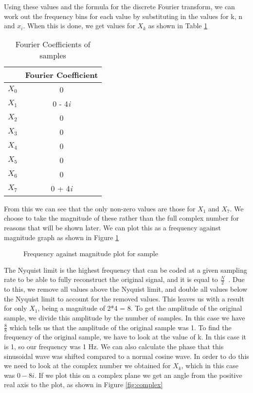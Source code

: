 Using these values and the formula for the discrete Fourier transform, we can work out the frequency bins for each value by substituting in the values for k, n and $x_i$. When this is done, we get values for $X_k$ as shown in Table \ref{table:fourierCoefficient}
\begin{table}[!htb]
\centering
\begin{tabular}{ |c|c| } 
\hline
& Fourier Coefficient \\
\hline
$X_0$ & 0 \\ 
$X_1$ & 0 - 4\textit{i} \\ 
$X_2$ & 0 \\ 
$X_3$ & 0 \\ 
$X_4$ & 0 \\ 
$X_5$ & 0 \\ 
$X_6$ & 0 \\ 
$X_7$ & 0 + 4\textit{i} \\ 
\hline
\end{tabular}
\caption{Fourier Coefficients of samples}
\label{table:fourierCoefficient}
\end{table}
From this we can see that the only non-zero values are those for $X_1$ and $X_7$. We choose to take the magnitude of these rather than the full complex number for reasons that will be shown later. We can plot this as a frequency against magnitude graph as shown in Figure \ref{fig:nyquist}
\begin{figure}[!htb]
\centering
\resizebox{10cm}{!}{}
\caption{Frequency against magnitude plot for sample}
\label{fig:nyquist}
\end{figure}
The Nyquist limit is the highest frequency that can be coded at a given sampling rate to be able to fully reconstruct the original signal, and it is equal to $\frac{N}{2}$~\cite{tretter1976introduction}. Due to this, we remove all values above the Nyquist limit, and double all values below the Nyquist limit to account for the removed values. This leaves us with a result for only $X_1$, being a magnitude of 2*4 = 8. To get the amplitude of the original sample, we divide this amplitude by the number of samples. In this case we have $\frac{8}{8}$ which tells us that the amplitude of the original sample was 1. To find the frequency of the original sample, we have to look at the value of k. In this case it is 1, so our frequency was 1 Hz. We can also calculate the phase that this sinusoidal wave was shifted compared to a normal cosine wave. In order to do this we need to look at the complex number we obtained for $X_k$, which in this case was $0-8\textit{i}$. If we plot this on a complex plane we get an angle from the positive real axis to the plot, as shown in Figure \ref{fig:complex}
